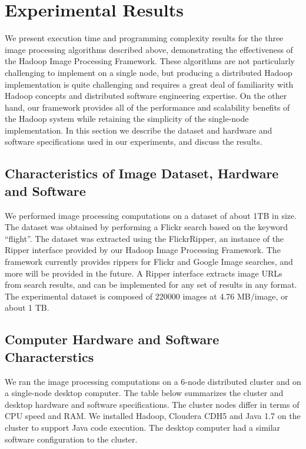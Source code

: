 \documentclass[conference]{IEEEtran}
\begin{document}
\section{Experimental Results}

We present execution time and programming complexity results for the
three image processing algorithms described above, demonstrating the
effectiveness of the Hadoop Image Processing Framework.  These
algorithms are not particularly challenging to implement on a single
node, but producing a distributed Hadoop implementation is quite
challenging and requires a great deal of familiarity with Hadoop
concepts and distributed software engineering expertise.  On the other
hand, our framework provides all of the performance and scalability
benefits of the Hadoop system while retaining the simplicity of the
single-node implementation.  In this section we describe the dataset
and hardware and software specifications used in our experiments, and
discuss the results.



\subsection{Characteristics of Image Dataset, Hardware and Software}
We performed image processing computations on a dataset of about 1TB
in size. The dataset was obtained by performing a Flickr search based
on the keyword ``flight''.  The dataset was extracted using the
FlickrRipper, an instance of the Ripper interface provided by our
Hadoop Image Processing Framework.  The framework currently provides
rippers for Flickr and Google Image searches, and more will be
provided in the future.  A Ripper interface extracts image URLs from
search results, and can be implemented for any set of results in any
format.  The experimental dataset is composed of 220000 images at 4.76
MB/image, or about 1 TB.

\subsection{Computer Hardware and Software Characterstics}
We ran the image processing computations on a 6-node distributed
cluster and on a single-node desktop computer. The table below
summarizes the cluster and desktop hardware and software
specifications. The cluster nodes differ in terms of CPU speed and
RAM. We installed Hadoop, Cloudera CDH5 and Java 1.7 on the cluster to
support Java code execution. The desktop computer had a similar
software configuration to the cluster.
\end{document}
